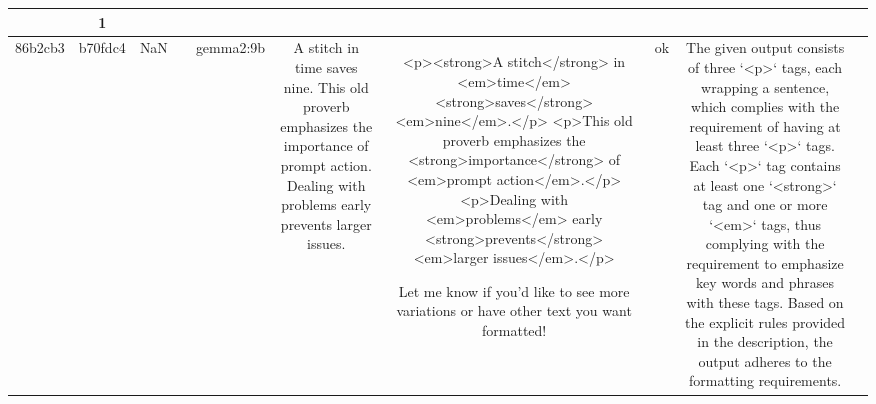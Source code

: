 \begin{table}[h!]
\begin{tabular}{|c|c|c|c|c|c|c|c|c|c|}
{{Based on these observations, the presence of duplicated sentences suggests a potential non-compliance with the instruction meant to format text sentence by sentence, as each sentence would typically be unique. However, this is speculative without input context.

Additionally, these `<p>` tags contain `<strong>` tags and `<em>` tags, which somewhat align with the requirement to emphasize key words and phrases, even though checking specific keywords without input is speculative.

Ultimately, while the output meets the requirement for the quantity of `<p>` tags and includes `<strong>` and `<em>` tags, the repetition of content raises questions about compliance with paragraph sentence formatting. However, since verifying sentence accuracy and relevance requires input context, this evaluation focuses on the compliance of the tags only.

No strict non-compliance with the description without knowing the input.
OK & 1\\
\hline
86b2cb3 & b70fdc4 & NaN &  & gemma2:9b & A stitch in time saves nine. This old proverb emphasizes the importance of prompt action. Dealing with problems early prevents larger issues. & <p><strong>A stitch</strong> in <em>time</em> <strong>saves</strong> <em>nine</em>.</p>
<p>This old proverb emphasizes the <strong>importance</strong> of <em>prompt action</em>.</p>
<p>Dealing with <em>problems</em> early <strong>prevents</strong> <em>larger issues</em>.</p> 



Let me know if you'd like to see more variations or have other text you want formatted! & ok & The given output consists of three `<p>` tags, each wrapping a sentence, which complies with the requirement of having at least three `<p>` tags. Each `<p>` tag contains at least one `<strong>` tag and one or more `<em>` tags, thus complying with the requirement to emphasize key words and phrases with these tags. Based on the explicit rules provided in the description, the output adheres to the formatting requirements.

}}
\end{tabular}
\end{table}
